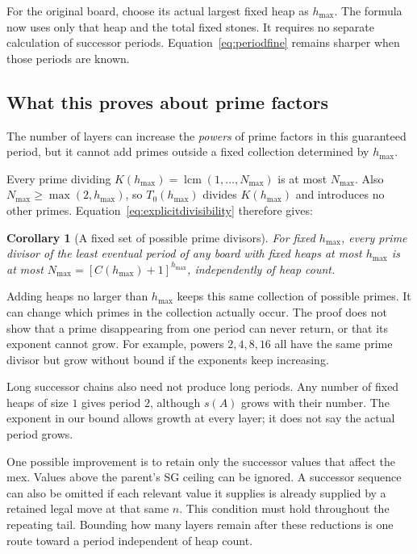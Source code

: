 \documentclass[10pt,a4paper]{article}
\newtheorem{corollary}[theorem]{Corollary}
\begin{document}
For the original board, choose its actual largest fixed heap as
$h_{\max}$. The formula now uses only that heap and the total
fixed stones. It requires no separate calculation of successor
periods. Equation~\eqref{eq:periodfine} remains sharper when
those periods are known.

\subsection{What this proves about prime factors}

The number of layers can increase the \emph{powers} of prime
factors in this guaranteed period, but it cannot add primes
outside a fixed collection determined by $h_{\max}$.

Every prime dividing $K(h_{\max})=\operatorname{lcm}(1,\ldots,N_{\max})$
is at most $N_{\max}$. Also $N_{\max}\ge\max(2,h_{\max})$,
so $T_0(h_{\max})$ divides $K(h_{\max})$ and introduces no
other primes. Equation~\eqref{eq:explicitdivisibility} therefore gives:

\begin{corollary}[A fixed set of possible prime divisors]
\label{cor:primepool}
For fixed $h_{\max}$, every prime divisor of the least eventual
period of any board with fixed heaps at most $h_{\max}$ is at most
$N_{\max}=[C(h_{\max})+1]^{h_{\max}}$, independently of heap count.
\end{corollary}

Adding heaps no larger than $h_{\max}$ keeps this same collection
of possible primes. It can change which primes in the collection
actually occur. The proof does not show that a prime disappearing
from one period can never return, or that its exponent cannot grow.
For example, powers $2,4,8,16$ all have the same prime divisor
but grow without bound if the exponents keep increasing.

Long successor chains also need not produce long periods.
Any number of fixed heaps of size $1$ gives period $2$, although
$s(A)$ grows with their number. The exponent in our bound allows
growth at every layer; it does not say the actual period grows.

One possible improvement is to retain only the successor values
that affect the mex. Values above the parent's SG ceiling can be
ignored. A successor sequence can also be omitted if each relevant
value it supplies is already supplied by a retained legal move at
that same $n$. This condition must hold throughout the repeating
tail. Bounding how many layers remain after these reductions is
one route toward a period independent of heap count.
\end{document}
